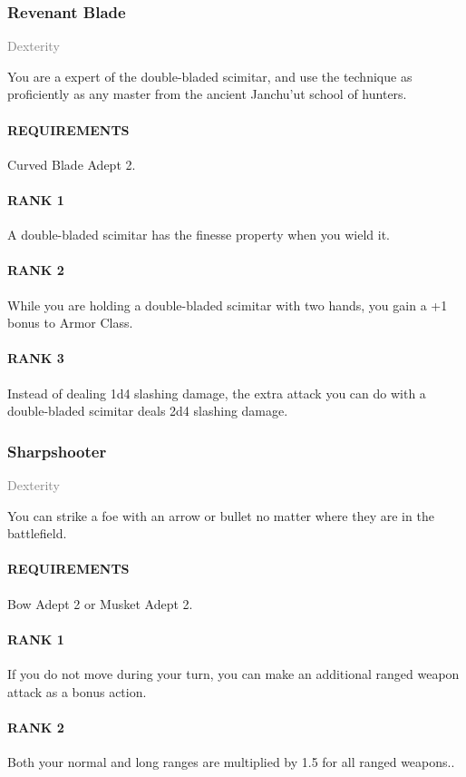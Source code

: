 \subsubsection{Revenant Blade} \label{feat::revenantblade}
\small{\textcolor{gray}{Dexterity}}

\normalsize
You are a expert of the double-bladed scimitar, and use the technique as proficiently as any master from the ancient Janchu'ut school of hunters.
\paragraph{REQUIREMENTS} Curved Blade Adept 2.
\paragraph{RANK 1} A double-bladed scimitar has the finesse property when you wield it.
\paragraph{RANK 2} While you are holding a double-bladed scimitar with two hands, you gain a +1 bonus to Armor Class.
\paragraph{RANK 3} Instead of dealing 1d4 slashing damage, the extra attack you can do with a double-bladed scimitar deals 2d4 slashing damage.

\subsubsection{Sharpshooter} \label{feat::sharpshooter}
\small{\textcolor{gray}{Dexterity}}

\normalsize
You can strike a foe with an arrow or bullet no matter where they are in the battlefield.
\paragraph{REQUIREMENTS} Bow Adept 2 or Musket Adept 2.
\paragraph{RANK 1} If you do not move during your turn, you can make an additional ranged weapon attack as a bonus action.
\paragraph{RANK 2} Both your normal and long ranges are multiplied by 1.5 for all ranged weapons..
